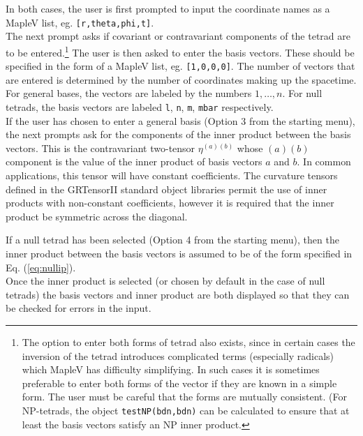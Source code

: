 \documentclass{article}
\begin{document}
In both cases, the user is first prompted to input the coordinate names
as a MapleV list, eg. \texttt{[r,theta,phi,t]}.\\

The next prompt asks if covariant or contravariant components of the
tetrad are to be entered.\footnote{The option to enter both forms of
tetrad also exists, since in certain cases the inversion of the tetrad
introduces complicated terms (especially radicals) which MapleV has
difficulty simplifying. In such cases it is sometimes preferable to
enter both forms of the vector if they are known in a simple form. The
user must be careful that the forms are mutually consistent. (For
NP-tetrads, the object \texttt{testNP(bdn,bdn)} can be calculated to ensure
that at least the basis vectors satisfy an NP inner product.} The user
is then asked to enter the basis vectors.  These should be specified
in the form of a MapleV list, eg. \texttt{[1,0,0,0]}.  The number of
vectors that are entered is determined by the number of coordinates
making up the spacetime. For general bases, the vectors are labeled
by the numbers $1, \ldots, n$. For null tetrads, the basis vectors are
labeled \texttt{l}, \texttt{n}, \texttt{m}, \texttt{mbar}
respectively.\\

If the user has chosen to enter a general basis (Option 3 from the
 starting menu), the next prompts ask for the components
of the inner product between the basis vectors. This is the
contravariant two-tensor $\eta^{(a)(b)}$ whose $(a)(b)$ component is
the value of the inner product of basis vectors $a$ and $b$.  In
common applications, this tensor will have constant coefficients. The
curvature tensors defined in the GRTensorII standard object libraries
permit the use of inner products with non-constant coefficients,
however it is required that the inner product be symmetric across the
diagonal.

If a null tetrad has been selected (Option 4 from the starting menu),
then the inner product between the basis vectors is assumed to be of the
form specified in Eq. (\ref{eq:nullip}).\\

Once the inner product is selected (or chosen by default in the case
of null tetrads) the basis vectors and inner product are both
displayed so that they can be checked for errors in the input.
%
\end{document}
